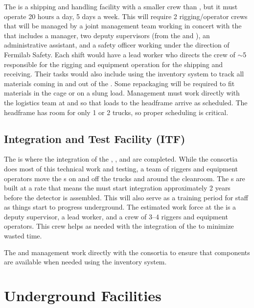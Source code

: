 The  is a shipping and handling facility with a smaller crew
than , but it must operate 20 hours a day, 5 days a week.
This will require 2 rigging/operator crews that will be managed by a
joint management team working in concert with the  that
includes a manager, two deputy supervisors (from the  and
), an administrative assistant, and a safety officer
working under the direction of Fermilab Safety.  Each shift would have
a lead worker who directs the crew of $\sim$5  responsible for the
rigging and equipment operation for the shipping and receiving.  Their
tasks would also include using the inventory system to track all
materials coming in and out of the . Some repackaging will
be required to fit materials in the cage or on a slung load.
Management must work directly with the  logistics team at
\surf and  so that loads to the headframe arrive as
scheduled.  The headframe has room for only 1 or 2 trucks, so proper
scheduling is critical.

\subsection{Integration and Test Facility (ITF)}

The  is where the integration of the
, , and  are completed. While the
consortia does most of this technical work and testing, a team of
riggers and equipment operators move the s on
and off the trucks and around the cleanroom.  The s are
built at a rate that means the  must start integration
approximately 2 years before the detector is assembled.  This will
also serve as a training period for  staff as things start
to progress underground.  The estimated work force at the  is a
deputy supervisor, a lead worker, and a crew of 3--4 riggers and
equipment operators.  This crew helps as needed with the
integration of the  to minimize wasted time.

The  and  management work directly with the
consortia to ensure that components are available when
needed using the inventory system.
  

\section{Underground Facilities}

